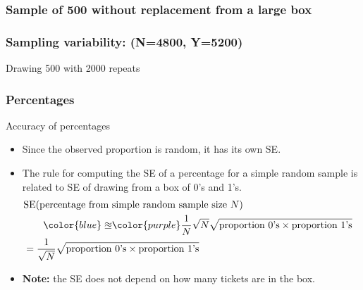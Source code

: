 \documentclass[handout]{beamer}
\begin{document}
   \begin{frame}
   \frametitle{Sample of 500 without replacement from a large box}
   \begin{center}
   \end{center}

   \end{frame}



   \begin{frame}
   \frametitle{Sampling variability: (N=4800, Y=5200)}
   \begin{center}
   \end{center}
   Drawing 500 with 2000 repeats
   \end{frame}


   \begin{frame} \frametitle{Percentages}

   \begin{block}
   {Accuracy of percentages}
   \begin{itemize}
   \item Since the observed proportion is random, it has its own SE.
   \item The rule for computing the SE of a percentage
   for a simple random sample is related to SE of drawing
   from a box of 0's and 1's.
   $$
   \begin{aligned}
   \lefteqn{\text{SE(percentage from simple random sample size $N$)}} \\
   & \qquad {\color{blue} \approxeq} {\color{purple} \frac{1}{N} } \sqrt{N} \sqrt{\text{proportion 0's} \times \text{proportion 1's}} \\
   &= \frac{1}{\sqrt{N}} \sqrt{\text{proportion 0's} \times \text{proportion 1's}}
   \end{aligned}
   $$

   \item {\bf Note:} the SE does not depend on how many tickets are in the box.
   \end{itemize}
   \end{block}
   \end{frame}
\end{document}
